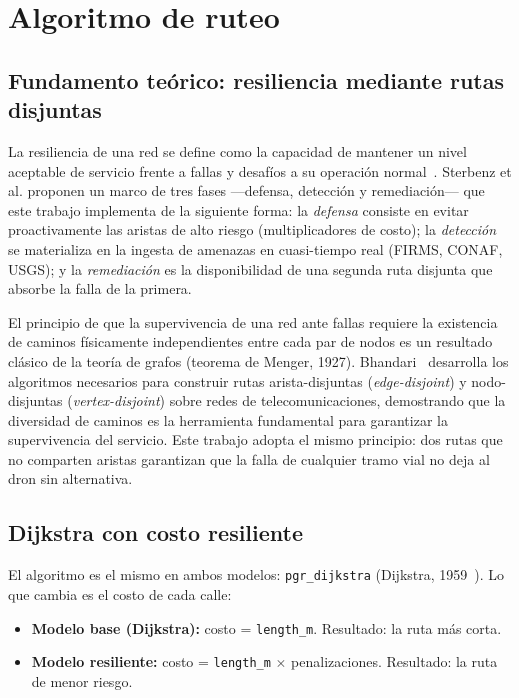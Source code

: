 \documentclass[conference]{IEEEtran}
\begin{document}
\section{Algoritmo de ruteo}
\label{sec:algoritmo}

\subsection{Fundamento teórico: resiliencia mediante rutas disjuntas}

La resiliencia de una red se define como la capacidad de mantener un nivel aceptable de servicio frente a fallas y desafíos a su operación normal~\cite{sterbenz2010}. Sterbenz et al. proponen un marco de tres fases ---defensa, detección y remediación--- que este trabajo implementa de la siguiente forma: la \textit{defensa} consiste en evitar proactivamente las aristas de alto riesgo (multiplicadores de costo); la \textit{detección} se materializa en la ingesta de amenazas en cuasi-tiempo real (FIRMS, CONAF, USGS); y la \textit{remediación} es la disponibilidad de una segunda ruta disjunta que absorbe la falla de la primera.

El principio de que la supervivencia de una red ante fallas requiere la existencia de caminos físicamente independientes entre cada par de nodos es un resultado clásico de la teoría de grafos (teorema de Menger, 1927). Bhandari~\cite{bhandari1999} desarrolla los algoritmos necesarios para construir rutas arista-disjuntas (\textit{edge-disjoint}) y nodo-disjuntas (\textit{vertex-disjoint}) sobre redes de telecomunicaciones, demostrando que la diversidad de caminos es la herramienta fundamental para garantizar la supervivencia del servicio. Este trabajo adopta el mismo principio: dos rutas que no comparten aristas garantizan que la falla de cualquier tramo vial no deja al dron sin alternativa.

\subsection{Dijkstra con costo resiliente}

El algoritmo es el mismo en ambos modelos: \texttt{pgr\_dijkstra} (Dijkstra, 1959~\cite{dijkstra1959}). Lo que cambia es el costo de cada calle:

\begin{itemize}[itemsep=2pt]
\item \textbf{Modelo base (Dijkstra):} costo = \texttt{length\_m}. Resultado: la ruta más corta.
\item \textbf{Modelo resiliente:} costo = \texttt{length\_m} $\times$ penalizaciones. Resultado: la ruta de menor riesgo.
\end{itemize}
\end{document}
